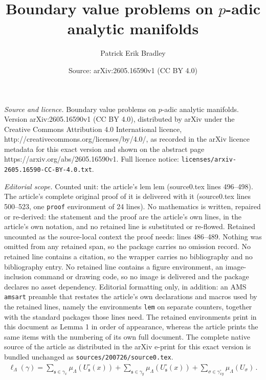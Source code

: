 \documentclass[10pt,a4paper]{amsart}
\title{Boundary value problems on $p$-adic analytic manifolds}
\author{Patrick Erik Bradley}
\date{Source: arXiv:2605.16590v1 (CC BY 4.0)}
\begin{document}
\maketitle

\noindent\emph{Source and licence.} Boundary value problems on $p$-adic analytic manifolds. Version arXiv:2605.16590v1 (CC BY 4.0), distributed by arXiv under the Creative Commons Attribution 4.0 International licence, http://creativecommons.org/licenses/by/4.0/, as recorded in the arXiv licence metadata for this exact version and shown on the abstract page https://arxiv.org/abs/2605.16590v1. Full licence notice: \texttt{licenses/arxiv-2605.16590-CC-BY-4.0.txt}.\par\smallskip

\noindent\textit{Editorial scope.} Counted unit: the article's lem lem (source0.tex lines 496--498). The article's complete original proof of it is delivered with it (source0.tex lines 500--523, one \texttt{proof} environment of 24 lines). No mathematics is written, repaired or re-derived: the statement and the proof are the article's own lines, in the article's own notation, and no retained line is substituted or re-flowed.  Retained uncounted as the source-local context the proof needs: lines 486--489.  Nothing was omitted from any retained span, so the package carries no omission record.  No retained line contains a citation, so the wrapper carries no bibliography and no bibliography entry.  No retained line contains a figure environment, an image-inclusion command or drawing code, so no image is delivered and the package declares no asset dependency.  Editorial formatting only, in addition: an AMS \texttt{amsart} preamble that restates the article's own declarations and macros used by the retained lines, namely the environments \texttt{lem} on separate counters, together with the standard packages those lines need.  The retained environments print in this document as Lemma 1 in order of appearance, whereas the article prints the same items with the numbering of its own full document.  The complete native source of the article as distributed in the arXiv e-print for this exact version is bundled unchanged as \texttt{sources/200726/source0.tex}.
\begin{align}\label{pathlength}
\ell_\Lambda(\gamma)=\sum\limits_{\mathfrak{s}\in\gamma_x}\mu_\Lambda(U_{\mathfrak{s}}^\circ(x))+\sum\limits_{\mathfrak{s}\in\gamma_y}\mu_\Lambda(U_{\mathfrak{s}}^\circ(x))
+\sum\limits_{\sigma\in\gamma_{xy}^\circ}\mu_\Lambda(U_\sigma)\,.
\end{align}
\end{document}
